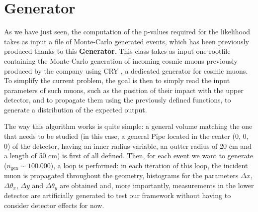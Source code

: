 \documentclass[a4paper, 11pt]{report}
\begin{document}
\begin{itemize}

    

\end{itemize}

\section{Generator} \label{sec:Generator}

As we have just seen, the computation of the p-values required for the likelihood takes as input a file of Monte-Carlo generated events, which has been previously produced thanks to this \textbf{Generator}. This class takes as input one rootfile containing the Monte-Carlo generation of incoming cosmic muons previously produced by the company using CRY \cite{CRY}, a dedicated generator for cosmic muons. To simplify the current problem, the goal is then to simply read the input parameters of such muons, such as the position of their impact with the upper detector, and to propagate them using the previously defined functions, to generate a distribution of the expected output.

The way this algorithm works is quite simple: a general volume matching the one that needs to be studied (in this case, a general Pipe located in the center (0, 0, 0) of the detector, having an inner radius variable, an outter radius of 20 cm and a length of 50 cm) is first of all defined. Then, for each event we want to generate ($n_{\text{gen}} \sim 100.000$), a loop is performed: in each iteration of this loop, the incident muon is propagated throughout the geometry, histograms for the parameters $\Delta x$, $\Delta \theta_x$, $\Delta y$ and $\Delta \theta_y$ are obtained and, more importantly, measurements in the lower detector are artificially generated to test our framework without having to consider detector effects for now.
\end{document}
